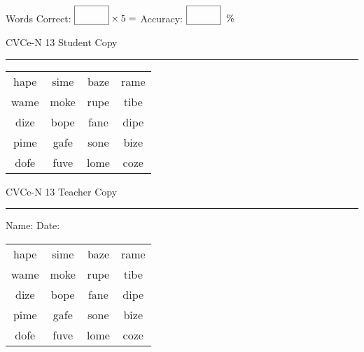 \documentclass{memoir}
\begin{document}
\small

Words Correct: $\fbox{\phantom{\huge 100}} \times 5 = $ Accuracy: $\fbox{\phantom{\huge 100}}\;\; \%$ 

\vfill

\newpage


\footnotesize \noindent
CVCe-N 13 \hfill Student Copy
\smallskip
\hrule

\Large

\setlength{\tabcolsep}{14pt}
\def\arraystretch{2}

{\selectfont


\begin{vplace}[0.5]
\begin{center}
\begin{tabular}{cccc}
hape & sime & baze & rame \\
wame & moke & rupe & tibe \\
dize & bope & fane & dipe \\
pime & gafe & sone & bize \\
dofe & fuve & lome & coze \\
\end{tabular}
\end{center}
\end{vplace}

}

\newpage

\footnotesize \noindent
CVCe-N 13 \hfill Teacher Copy
\smallskip
\hrule

\small

\vfill

\noindent
Name: \underline{\hspace{1.75in}} \hfill Date: \underline{\hspace{1in}}

\Large

{\selectfont


\begin{vplace}[0.5]
\begin{center}
\begin{tabular}{cccc}
hape & sime & baze & rame \\
wame & moke & rupe & tibe \\
dize & bope & fane & dipe \\
pime & gafe & sone & bize \\
dofe & fuve & lome & coze \\
\end{tabular}
\end{center}
\end{vplace}



}
\end{document}
